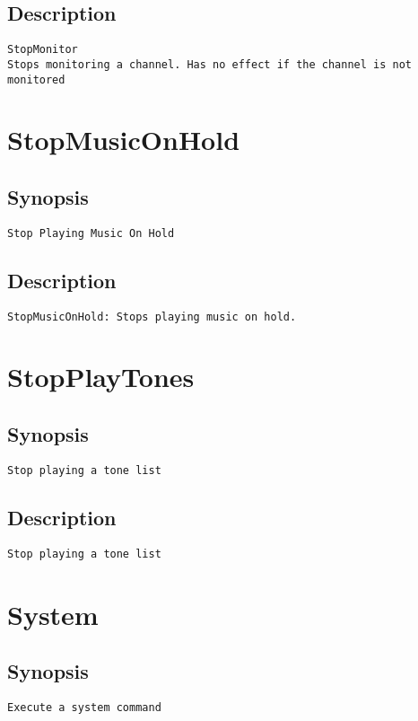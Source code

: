 \subsection{Description}
\begin{verbatim}
StopMonitor
Stops monitoring a channel. Has no effect if the channel is not monitored

\end{verbatim}


\section{StopMusicOnHold}
\subsection{Synopsis}
\begin{verbatim}
Stop Playing Music On Hold
\end{verbatim}
\subsection{Description}
\begin{verbatim}
StopMusicOnHold: Stops playing music on hold.

\end{verbatim}


\section{StopPlayTones}
\subsection{Synopsis}
\begin{verbatim}
Stop playing a tone list
\end{verbatim}
\subsection{Description}
\begin{verbatim}
Stop playing a tone list
\end{verbatim}


\section{System}
\subsection{Synopsis}
\begin{verbatim}
Execute a system command
\end{verbatim}
